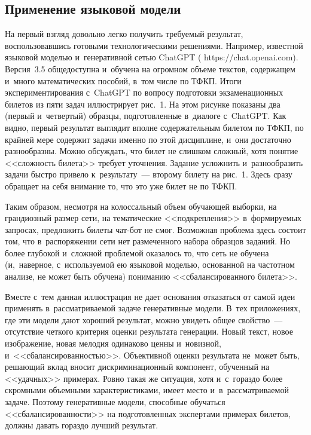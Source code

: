 \begin{multicols}{2}
\subsection{Применение языковой модели}

  На первый взгляд довольно легко получить требуемый результат, 
воспользовавшись готовыми технологическими решениями. Например, 
известной языковой моделью и~генеративной сетью ChatGPT ({\sf 
https://chat.openai.com}). Версия~3.5 общедоступна и~обучена на огромном 
объеме текстов, содержащем и~много математических пособий, в~том числе 
по ТФКП. Итоги экспериментирования с~ChatGPT по вопросу подготовки 
экзаменационных билетов из пяти задач иллюстрирует рис.~1. На этом 
рисунке показаны два (первый и~четвертый) образцы, подготовленные 
в~диалоге с~ChatGPT. Как видно, первый результат выглядит вполне 
содержательным билетом по ТФКП, по крайней мере содержит задачи 
именно по этой дисциплине, и~они достаточно разнообразны. Можно 
обсуждать, что билет не слишком сложный, хотя понятие <<слож\-ность 
билета>> требует уточнения. Задание усложнить и~разнообразить задачи 
быстро привело к~результату~--- второму билету на рис.~1. Здесь сразу 
обращает на себя внимание то, что это уже билет не по ТФКП.
  
  
  
  Таким образом, несмотря на колоссальный объем обучающей выборки, на 
грандиозный размер сети, на тематические <<подкрепления>> 
в~формируемых запросах, предложить билеты чат-бот не смог. Возможная 
проблема здесь состоит том, что в~распоряжении сети нет размеченного 
набора образцов заданий. Но более глубокой и~слож\-ной проб\-ле\-мой 
оказалось то, что сеть не обучена (и,~наверное, с~используемой ею языковой 
моделью, основанной на частотном анализе, не может быть обуче\-на) 
пониманию <<сбалансированного билета>>.
  
  Вместе с~тем данная иллюстрация не дает основания отказаться от самой 
идеи применять в~рас\-смат\-ри\-ва\-емой задаче генеративные модели. В~тех 
приложениях, где эти модели дают хороший результат, можно увидеть общее 
свойство~--- отсутствие четкого критерия оценки результата генерации. 
Новый текст, новое изображение, новая мелодия одинаково ценны 
и~новизной, и~<<сбалансированностью>>. Объективной оценки результата 
не~может быть, решающий вклад вносит дискриминационный компонент, 
обученный на <<удачных>> примерах. Ровно такая же ситуация, хотя 
и~с~гораздо более скромными объемными характеристиками, имеет место 
и~в~рассматриваемой задаче. Поэтому генеративные модели, способные 
обучаться <<сбалансированности>> на подготовленных экспертами 
примерах билетов, должны давать гораздо лучший результат.


\end{multicols}
